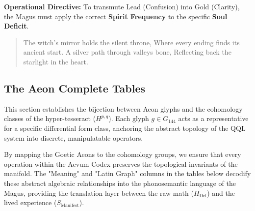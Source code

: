 \documentclass[11pt, letterpaper]{article}
\begin{document}
\vspace{1em}
\noindent \textbf{Operational Directive:} To transmute Lead (Confusion) into Gold (Clarity), the Magus must apply the correct \textbf{Spirit Frequency} to the specific \textbf{Soul Deficit}.

\begin{verse}
    The witch's mirror holds the silent throne,
    Where every ending finds its ancient start.
    A silver path through valleys bone,
    Reflecting back the starlight in the heart.
\end{verse}

\newpage
\subsection{The Aeon Complete Tables}\label{sec:15.5}

This section establishes the bijection between Aeon glyphs and the cohomology classes of the hyper-tesseract ($H^{p,q}$). Each glyph $g \in G_{144}$ acts as a representative for a specific differential form class, anchoring the abstract topology of the QQL system into discrete, manipulatable operators.

By mapping the Goetic Aeons to the cohomology groups, we ensure that every operation within the Aevum Codex preserves the topological invariants of the manifold. The "Meaning" and "Latin Graph" columns in the tables below decodify these abstract algebraic relationships into the phonosemantic language of the Magus, providing the translation layer between the raw math ($H_{\text{Def}}$) and the lived experience ($S_{\text{Manifest}}$).
\end{document}
